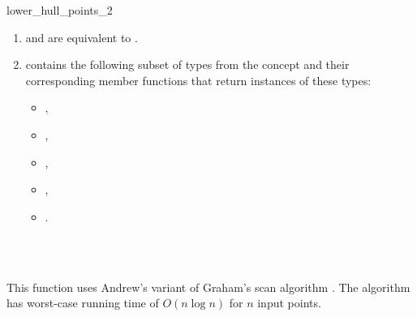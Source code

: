 \begin{ccRefFunction}{lower_hull_points_2}
\begin{enumerate}
   \item    {} and 
            are equivalent to .
   \item    {} contains the following subset of types from
            the concept  and their corresponding member
            functions that return instances of these types:
            \begin{itemize}
                \item {},
		\item {},
                \item {}, 
                \item {},
                \item {}.
            \end{itemize}
\end{enumerate}


\ccSeeAlso

 \\
 \\

\ccImplementation

This function uses Andrew's variant of Graham's scan algorithm 
\cite{a-aeach-79,m-mdscg-84}.  The algorithm has worst-case running time 
of $O(n \log n)$ for $n$ input points.

\end{ccRefFunction}



